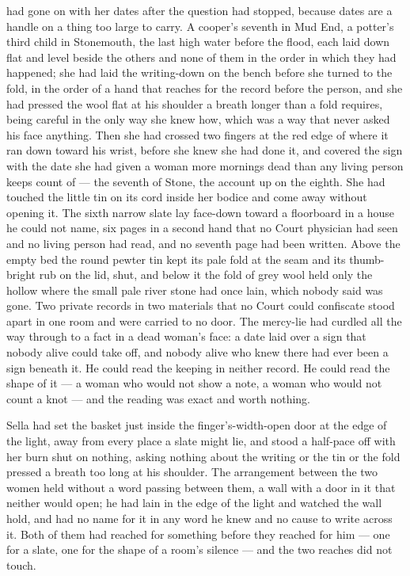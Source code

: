  had gone on with her dates after the question had stopped, because dates are a handle on a thing too large to carry. A cooper's seventh in Mud End, a potter's third child in Stonemouth, the last high water before the flood, each laid down flat and level beside the others and none of them in the order in which they had happened; she had laid the writing-down on the bench before she turned to the fold, in the order of a hand that reaches for the record before the person, and she had pressed the wool flat at his shoulder a breath longer than a fold requires, being careful in the only way she knew how, which was a way that never asked his face anything. Then she had crossed two fingers at the red edge of  where it ran down toward his wrist, before she knew she had done it, and covered the sign with the date she had given a woman more mornings dead than any living person keeps count of --- the seventh of Stone, the account up on the eighth. She had touched the little tin on its cord inside her bodice and come away without opening it. The sixth narrow slate lay face-down toward a floorboard in a house he could not name, six pages in a second hand that no Court physician had seen and no living person had read, and no seventh page had been written. Above the empty bed the round pewter tin kept its pale fold at the seam and its thumb-bright rub on the lid, shut, and below it the fold of grey wool held only the hollow where the small pale river stone had once lain, which nobody said was gone. Two private records in two materials that no Court could confiscate stood apart in one room and were carried to no door. The mercy-lie had curdled all the way through to a fact in a dead woman's face: a date laid over a sign that nobody alive could take off, and nobody alive who knew there had ever been a sign beneath it. He could read the keeping in neither record. He could read the shape of it --- a woman who would not show a note, a woman who would not count a knot --- and the reading was exact and worth nothing.

Sella had set the basket just inside the finger's-width-open door at the edge of the light, away from every place a slate might lie, and stood a half-pace off with her burn shut on nothing, asking nothing about the writing or the tin or the fold pressed a breath too long at his shoulder. The arrangement between the two women held without a word passing between them, a wall with a door in it that neither would open; he had lain in the edge of the light and watched the wall hold, and had no name for it in any word he knew and no cause to write across it. Both of them had reached for something before they reached for him --- one for a slate, one for the shape of a room's silence --- and the two reaches did not touch.

